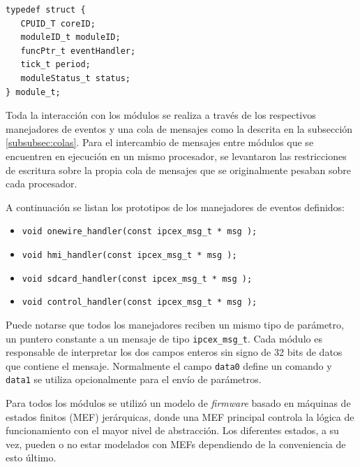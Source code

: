 \vspace{10px}

\begin{lstlisting}[caption={Definición de un nuevo tipo de dato module\_t.},label={lst:module_t}]
typedef struct {
   CPUID_T coreID;
   moduleID_t moduleID;
   funcPtr_t eventHandler;
   tick_t period;
   moduleStatus_t status;
} module_t;
\end{lstlisting}

\vspace{10px}

Toda la interacción con los módulos se realiza a través de los respectivos manejadores de eventos y una cola de mensajes como la descrita en la subsección \ref{subsubsec:colas}. Para el intercambio de mensajes entre módulos que se encuentren en ejecución en un mismo procesador, se levantaron las restricciones de escritura sobre la propia cola de mensajes que se originalmente pesaban sobre cada procesador.

A continuación se listan los prototipos de los manejadores de eventos definidos:

\vspace{10px}

\begin{itemize}
  \item \texttt{void onewire\_handler(const ipcex\_msg\_t * msg );} 
  \item \texttt{void hmi\_handler(const ipcex\_msg\_t * msg );} 
  \item \texttt{void sdcard\_handler(const ipcex\_msg\_t * msg );} 
  \item \texttt{void control\_handler(const ipcex\_msg\_t * msg );} 
\end{itemize}

\vspace{10px}

Puede notarse que todos los manejadores reciben un mismo tipo de parámetro, un puntero constante a un mensaje de tipo \texttt{ipcex\_msg\_t}.  Cada módulo es responsable de interpretar los dos campos enteros sin signo de 32 bits de datos que contiene el mensaje.  Normalmente el campo \texttt{data0} define un comando y \texttt{data1} se utiliza opcionalmente para el envío de parámetros.

Para todos los módulos se utilizó un modelo de \textit{firmware} basado en máquinas de estados finitos (MEF) jerárquicas, donde una MEF principal controla la lógica de funcionamiento con el mayor nivel de abstracción. Los diferentes estados, a su vez, pueden o no estar modelados con MEFs dependiendo de la conveniencia de esto último.

